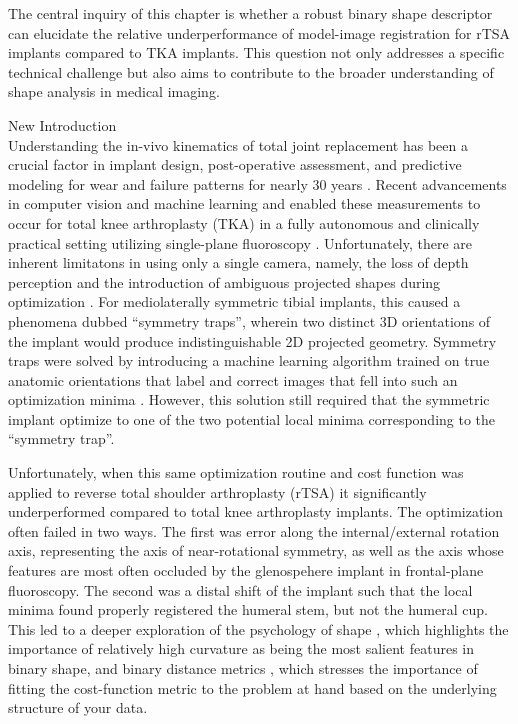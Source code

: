 The central inquiry of this chapter is whether a robust binary shape descriptor can elucidate the relative underperformance of model-image registration for rTSA implants compared to TKA implants. This question not only addresses a specific technical challenge but also aims to contribute to the broader understanding of shape analysis in medical imaging.

	{\Large New Introduction}\\
Understanding the in-vivo kinematics of total joint replacement has been a crucial factor in implant design, post-operative assessment, and predictive modeling for wear and failure patterns for nearly 30 years \cite{freglyComputationalWearPrediction2005,banks2003HapPaul2004,banksRationaleResultsFixedBearing2019}.
Recent advancements in computer vision and machine learning and enabled these measurements to occur for total knee arthroplasty (TKA) in a fully autonomous and clinically practical setting utilizing single-plane fluoroscopy \cite{brobergValidationMachineLearning2023,jensenJointTrackMachine2023}.
Unfortunately, there are inherent limitatons in using only a single camera, namely, the loss of depth perception and the introduction of ambiguous projected shapes during optimization \cite{floodAutomatedRegistration3D2018,mahfouzRobustMethodRegistration2003,zuffiModelbasedMethodReconstruction1999,banksAccurateMeasurementThreedimensional1996}.
For mediolaterally symmetric tibial implants, this caused a phenomena dubbed ``symmetry traps'', wherein two distinct 3D orientations of the implant would produce indistinguishable 2D projected geometry.
Symmetry traps were solved by introducing a machine learning algorithm trained on true anatomic orientations that label and correct images that fell into such an optimization minima \cite{jensenCorrectingSymmetricImplantInReview}.
However, this solution still required that the symmetric implant optimize to one of the two potential local minima corresponding to the ``symmetry trap''.

Unfortunately, when this same optimization routine and cost function \cite{floodAutomatedRegistration3D2018,jensenJointTrackMachine2023} was applied to reverse total shoulder arthroplasty (rTSA) it significantly underperformed compared to total knee arthroplasty implants.
The optimization often failed in two ways.
The first was error along the internal/external rotation axis, representing the axis of near-rotational symmetry, as well as the axis whose features are most often occluded by the glenospehere implant in frontal-plane fluoroscopy.
The second was a distal shift of the implant such that the local minima found properly registered the humeral stem, but not the humeral cup.
This led to a deeper exploration of the psychology of shape \cite{attneaveInformationalAspectsVisual1954,attneaveQuantitativeStudyShape1956}, which highlights the importance of relatively high curvature as being the most salient features in binary shape, and binary distance metrics \cite{reinkeCommonLimitationsImage2023,reinkeUnderstandingMetricrelatedPitfalls2023}, which stresses the importance of fitting the cost-function metric to the problem at hand based on the underlying structure of your data.

